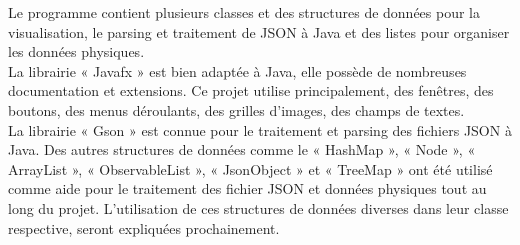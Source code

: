 \documentclass[a4paper]{article}
\begin{document}
Le programme contient plusieurs classes et des structures de données pour la visualisation, le parsing et traitement de JSON à Java et des listes pour organiser les données physiques.\\
La librairie « Javafx » est bien adaptée à Java, elle possède de nombreuses documentation et extensions. Ce projet utilise principalement, des fenêtres, des boutons, des menus déroulants, des grilles d’images, des champs de textes.\\
La librairie « Gson » est connue pour le traitement et parsing des fichiers JSON à Java.
Des autres structures de données comme le « HashMap », « Node », « ArrayList », « ObservableList », « JsonObject » et « TreeMap » ont été utilisé comme aide pour le traitement des fichier JSON et données physiques tout au long du projet. L’utilisation de ces structures de données diverses dans leur classe respective, seront expliquées prochainement.\\
\end{document}
